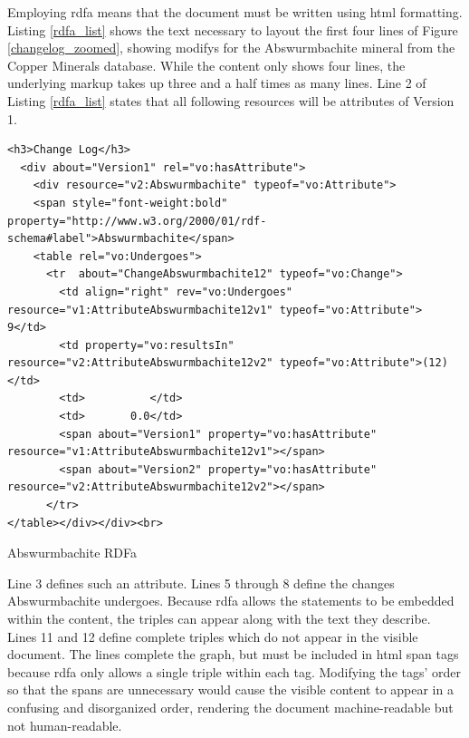 Employing \gls{rdfa} means that the document must be written using \gls{html} formatting.
Listing \ref{rdfa_list} shows the text necessary to layout the first four lines of Figure \ref{changelog_zoomed}, showing \glspl{modify} for the Abswurmbachite mineral from the Copper Minerals database.
While the content only shows four lines, the underlying markup takes up three and a half times as many lines.
Line 2 of Listing \ref{rdfa_list} states that all following resources will be \glspl{attribute} of Version 1.
\begin{listing}
	\begin{verbatim}
<h3>Change Log</h3>
  <div about="Version1" rel="vo:hasAttribute">
    <div resource="v2:Abswurmbachite" typeof="vo:Attribute">
    <span style="font-weight:bold" property="http://www.w3.org/2000/01/rdf-schema#label">Abswurmbachite</span>
    <table rel="vo:Undergoes">
      <tr  about="ChangeAbswurmbachite12" typeof="vo:Change">
        <td align="right" rev="vo:Undergoes" resource="v1:AttributeAbswurmbachite12v1" typeof="vo:Attribute"> 9</td>
        <td property="vo:resultsIn" resource="v2:AttributeAbswurmbachite12v2" typeof="vo:Attribute">(12)</td>
        <td>          </td>
        <td>       0.0</td>
        <span about="Version1" property="vo:hasAttribute" resource="v1:AttributeAbswurmbachite12v1"></span>
        <span about="Version2" property="vo:hasAttribute" resource="v2:AttributeAbswurmbachite12v2"></span>
      </tr>
</table></div></div><br>
	\end{verbatim}
	\caption{Abswurmbachite RDFa\label{rdfa_list}}
\end{listing}
Line 3 defines such an \gls{attribute}.
Lines 5 through 8 define the \glspl{change} Abswurmbachite undergoes.
Because \gls{rdfa} allows the statements to be embedded within the content, the triples can appear along with the text they describe.
Lines 11 and 12 define complete triples which do not appear in the visible document.
The lines complete the graph, but must be included in \gls{html} span tags because \gls{rdfa} only allows a single triple within each tag.
Modifying the tags' order so that the spans are unnecessary would cause the visible content to appear in a confusing and disorganized order, rendering the document machine-readable but not human-readable.


